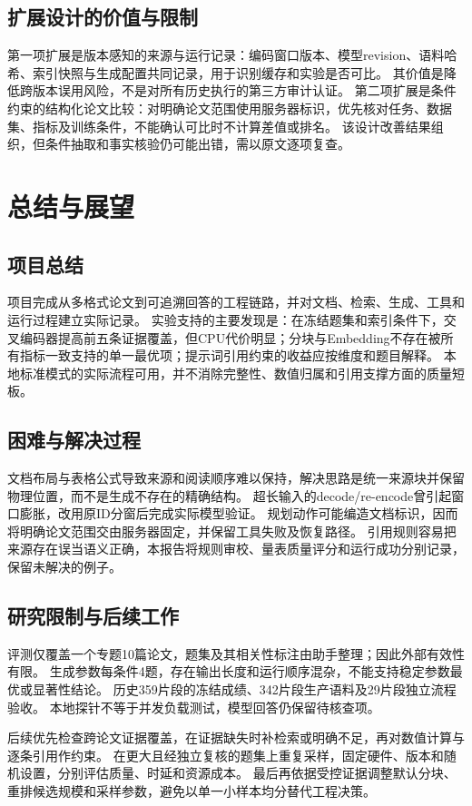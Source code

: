 \documentclass[UTF8,a4paper,zihao=-4,fontset=fandol]{ctexart}
\begin{document}
\subsection{扩展设计的价值与限制}
第一项扩展是版本感知的来源与运行记录：编码窗口版本、模型revision、语料哈希、索引快照与生成配置共同记录，用于识别缓存和实验是否可比。
其价值是降低跨版本误用风险，不是对所有历史执行的第三方审计认证。
第二项扩展是条件约束的结构化论文比较：对明确论文范围使用服务器标识，优先核对任务、数据集、指标及训练条件，不能确认可比时不计算差值或排名。
该设计改善结果组织，但条件抽取和事实核验仍可能出错，需以原文逐项复查。

\section{总结与展望}
\subsection{项目总结}
项目完成从多格式论文到可追溯回答的工程链路，并对文档、检索、生成、工具和运行过程建立实际记录。
实验支持的主要发现是：在冻结题集和索引条件下，交叉编码器提高前五条证据覆盖，但CPU代价明显；分块与Embedding不存在被所有指标一致支持的单一最优项；提示词引用约束的收益应按维度和题目解释。
本地标准模式的实际流程可用，并不消除完整性、数值归属和引用支撑方面的质量短板。

\subsection{困难与解决过程}
文档布局与表格公式导致来源和阅读顺序难以保持，解决思路是统一来源块并保留物理位置，而不是生成不存在的精确结构。
超长输入的decode/re-encode曾引起窗口膨胀，改用原ID分窗后完成实际模型验证。
规划动作可能编造文档标识，因而将明确论文范围交由服务器固定，并保留工具失败及恢复路径。
引用规则容易把来源存在误当语义正确，本报告将规则审校、量表质量评分和运行成功分别记录，保留未解决的例子。

\subsection{研究限制与后续工作}
评测仅覆盖一个专题10篇论文，题集及其相关性标注由助手整理；因此外部有效性有限。
生成参数每条件4题，存在输出长度和运行顺序混杂，不能支持稳定参数最优或显著性结论。
历史359片段的冻结成绩、342片段生产语料及29片段独立流程验收。
本地探针不等于并发负载测试，模型回答仍保留待核查项。

后续优先检查跨论文证据覆盖，在证据缺失时补检索或明确不足，再对数值计算与逐条引用作约束。
在更大且经独立复核的题集上重复采样，固定硬件、版本和随机设置，分别评估质量、时延和资源成本。
最后再依据受控证据调整默认分块、重排候选规模和采样参数，避免以单一小样本均分替代工程决策。
\FloatBarrier
\end{document}
